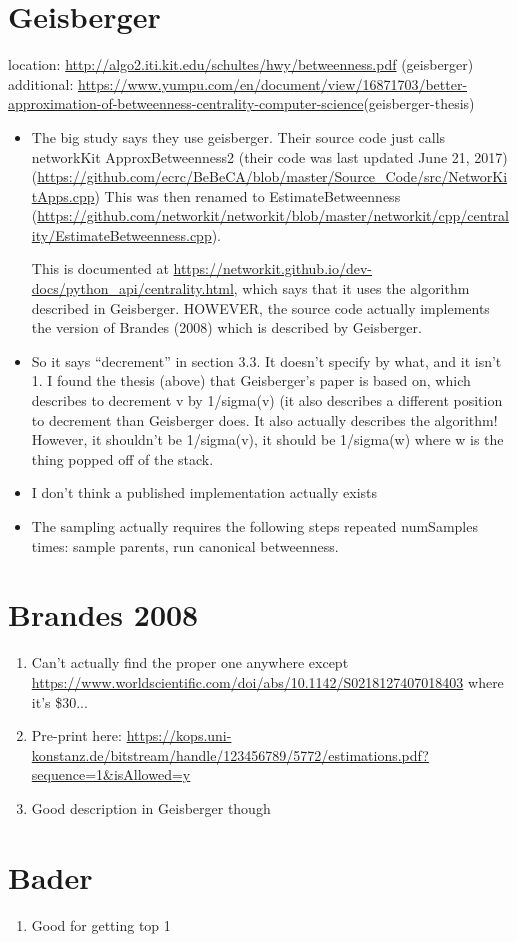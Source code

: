 \documentclass[a4paper,12pt,english]{article}
\begin{document}
\section*{Geisberger}
location: \url{http://algo2.iti.kit.edu/schultes/hwy/betweenness.pdf} (geisberger)
additional: \url{https://www.yumpu.com/en/document/view/16871703/better-approximation-of-betweenness-centrality-computer-science}(geisberger-thesis)
\begin{itemize}
\item The big study says they use geisberger. Their source code just calls networkKit ApproxBetweenness2 (their code was last updated June 21, 2017) (\url{https://github.com/ecrc/BeBeCA/blob/master/Source_Code/src/NetworKitApps.cpp}) This was then renamed to EstimateBetweenness (\url{https://github.com/networkit/networkit/blob/master/networkit/cpp/centrality/EstimateBetweenness.cpp}).

This is documented at \url{https://networkit.github.io/dev-docs/python_api/centrality.html}, which says that it uses the algorithm described in Geisberger. HOWEVER, the source code actually implements the version of Brandes (2008) which is described by Geisberger.


\item So it says ``decrement'' in section 3.3. It doesn't specify by what, and it isn't 1. I found the thesis (above) that Geisberger's paper is based on, which describes to decrement v by 1/sigma(v) (it also describes a different position to decrement than Geisberger does. It also actually describes the algorithm! However, it shouldn't be 1/sigma(v), it should be 1/sigma(w) where w is the thing popped off of the stack.

\item I don't think a published implementation actually exists

\item The sampling actually requires the following steps repeated numSamples times: sample parents, run canonical betweenness.
\end{itemize}
\section*{Brandes 2008}
\begin{enumerate}
\item Can't actually find the proper one anywhere except \url{https://www.worldscientific.com/doi/abs/10.1142/S0218127407018403} where it's \$30...
\item Pre-print here: \url{https://kops.uni-konstanz.de/bitstream/handle/123456789/5772/estimations.pdf?sequence=1&isAllowed=y}
\item Good description in Geisberger though
\end{enumerate}

\section*{Bader}
\begin{enumerate}
\item Good for getting top 1%
\end{enumerate}
\end{document}
